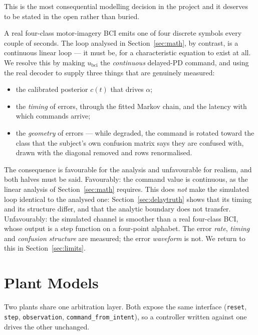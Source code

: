 \documentclass[11pt,a4paper]{article}
\newcommand{\ubci}{u_{\mathrm{bci}}}
\theoremstyle{plain}
\theoremstyle{definition}
\begin{document}
This is the most consequential modelling decision in the project and it
deserves to be stated in the open rather than buried.

A real four-class motor-imagery BCI emits one of four discrete symbols
every couple of seconds. The loop analysed in Section~\ref{sec:math},
by contrast, is a continuous linear loop --- it must be, for a
characteristic equation to exist at all. We resolve this by making
$\ubci$ the \emph{continuous} delayed-PD command, and using the real
decoder to supply three things that are genuinely measured:

\begin{itemize}
\item the calibrated posterior $c(t)$ that drives $\alpha$;
\item the \emph{timing} of errors, through the fitted Markov chain, and
      the latency with which commands arrive;
\item the \emph{geometry} of errors --- while degraded, the command is
      rotated toward the class that the subject's own confusion matrix
      says they are confused with, drawn with the diagonal removed and
      rows renormalised.
\end{itemize}

The consequence is favourable for the analysis and unfavourable for
realism, and both halves must be said. Favourably: the command value
is continuous, as the linear analysis of Section~\ref{sec:math}
requires. This does \emph{not} make the simulated loop identical to the
analysed one: Section~\ref{sec:delaytruth} shows that its timing and its
structure differ, and that the analytic boundary does not transfer.
Unfavourably: the simulated channel is smoother than a
real four-class BCI, whose output is a step function on a four-point
alphabet. The error \emph{rate}, \emph{timing} and \emph{confusion
structure} are measured; the error \emph{waveform} is not. We return to
this in Section~\ref{sec:limits}.

\section{Plant Models}
\label{sec:plants}

Two plants share one arbitration layer. Both expose the same interface
(\texttt{reset}, \texttt{step}, \texttt{observation},
\texttt{command\_from\_intent}), so a controller written against one
drives the other unchanged.
\end{document}
